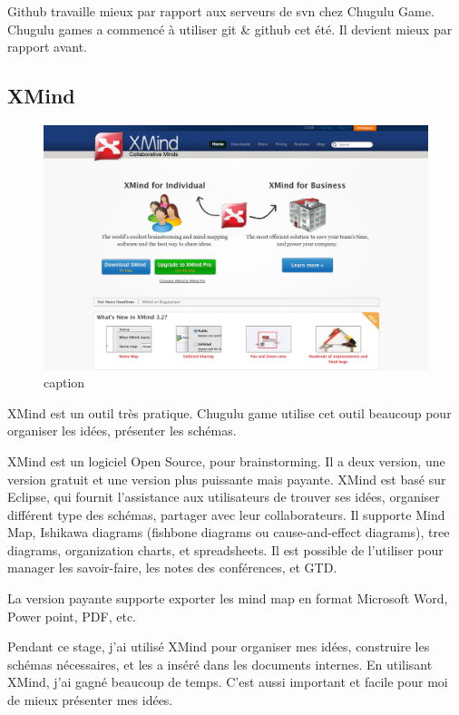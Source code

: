 Github travaille mieux par rapport aux serveurs de svn chez Chugulu Game. Chugulu games a commencé à utiliser git \& github cet été. Il devient mieux par rapport avant.


\subsection{XMind} %


\begin{figure}[htbp]
	\centering
		\includegraphics[width=6in]{Image/Xmind.png}
	\caption{caption}
	\label{fig:Image_Xmind}
\end{figure}

XMind est un outil très pratique. Chugulu game utilise cet outil beaucoup pour organiser les idées, présenter les schémas. 

XMind est un logiciel Open Source, pour brainstorming. Il a deux version, une version gratuit et une version plus puissante mais payante. XMind est basé sur Eclipse, qui fournit l'assistance aux utilisateurs de trouver ses idées, organiser différent type des schémas, partager avec leur collaborateurs. Il supporte Mind Map, Ishikawa diagrams (fishbone diagrams ou cause-and-effect diagrams), tree diagrams, organization charts, et spreadsheets. Il est possible de l'utiliser pour manager les savoir-faire, les notes des conférences, et GTD. 

La version payante supporte exporter les mind map en format Microsoft Word, Power point, PDF, etc.

Pendant ce stage, j'ai utilisé XMind pour organiser mes idées, construire les schémas nécessaires, et les a inséré dans les documents internes. En utilisant XMind, j'ai gagné beaucoup de temps. C'est aussi important et facile pour moi de mieux présenter mes idées.

